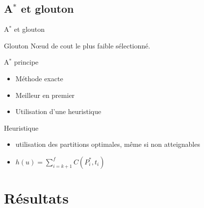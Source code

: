 \documentclass[tikz]{beamer}
\begin{document}
\subsection{A\(^*\) et glouton}
\begin{frame}[c]{A\(^*\) et glouton}
  \begin{block}{Glouton}
    Nœud de cout le plus faible sélectionné.
  \end{block}
  \begin{block}{A\(^*\) principe}
    \begin{itemize}
      \item Méthode exacte
      \item Meilleur en premier
      \item Utilisation d'une heuristique
    \end{itemize}
  \end{block}
  \begin{block}{Heuristique}
    \begin{itemize}
      \item utilisation des partitions optimales, même si non atteignables
      \item \(h(u) = \sum_{i=k+1}^f C(P^*_i, t_i)\)
    \end{itemize}
  \end{block}
\end{frame}

\section{Résultats}
\end{document}
